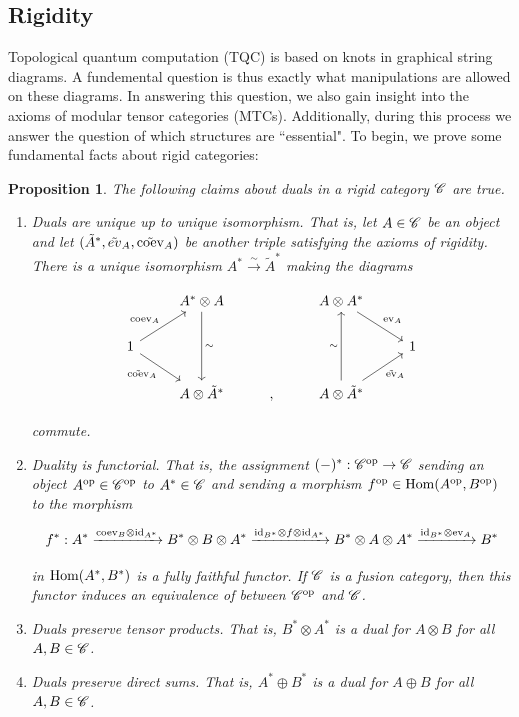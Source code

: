 \documentclass{article}
\newtheorem{proposition}{Proposition}[section]
\theoremstyle{definition}
\numberwithin{figure}{section}
\begin{document}
\subsection{Rigidity}
\label{Rigidity}

Topological quantum computation (TQC) is based on knots in graphical string diagrams. A fundemental question is thus exactly what manipulations are allowed on these diagrams. In answering this question, we also gain insight into the axioms of modular tensor categories (MTCs). Additionally, during this process we answer the question of which structures are ``essential". To begin, we prove some fundamental facts about rigid categories:

\begin{proposition}\label{rigidity} The following claims about duals in a rigid category $\mathscr{C}$ are true.

\begin{enumerate}
\item Duals are unique up to unique isomorphism. That is, let $A\in \mathscr{C}$ be an object and let $(\tilde{A}^{*},\tilde{ev}_A,\tilde{\mathrm{coev}}_A)$ be another triple satisfying the axioms of rigidity. There is a unique isomorphism $A^{*}\xrightarrow{\sim}\tilde{A}^{*}$ making the diagrams

\[\begin{tikzcd}
	& {A^{*}\otimes A} && {A\otimes A^{*}} \\
	1 &&&& 1 \\
	& {A\otimes \tilde{A}^*} & {,} & {A\otimes \tilde{A}^{*}}
	\arrow["{\coev_A}", from=2-1, to=1-2]
	\arrow["{\tilde{\coev}_A}"', from=2-1, to=3-2]
	\arrow["\sim", from=1-2, to=3-2]
	\arrow["\sim", from=3-4, to=1-4]
	\arrow["{\ev_A}", from=1-4, to=2-5]
	\arrow["{\tilde{\ev}_A}"', from=3-4, to=2-5]
\end{tikzcd}\]

commute.

\item Duality is functorial. That is, the assignment $(\--)^{*}:\mathscr{C}^{\mathrm{op}}\to \mathscr{C}$ sending an object $A^{\mathrm{op}}\in \mathscr{C}^{\mathrm{op}}$ to $A^{*}\in \mathscr{C}$ and sending a morphism $f^{\mathrm{op}}\in \mathrm{Hom}(A^{\mathrm{op}},B^{\mathrm{op}})$ to the morphism

$$f^*:A^*\xrightarrow{\mathrm{coev}_B\otimes \mathrm{id}_{A^*}} B^*\otimes B\otimes A^*\xrightarrow{\mathrm{id}_{B^*}\otimes f\otimes \mathrm{id}_{A^*}} B^*\otimes A\otimes A^* \xrightarrow{\mathrm{id}_{B^*}\otimes \mathrm{ev}_A} B^*$$

in $\mathrm{Hom}(A^{*},B^{*})$ is a fully faithful functor. If $\mathscr{C}$ is a fusion category, then this functor induces an equivalence of between $\mathscr{C}^{\mathrm{op}}$ and $\mathscr{C}$.

\item Duals preserve tensor products. That is, $B^{*}\otimes A^*$ is a dual for $A\otimes B$ for all $A,B\in \mathscr{C}$.

\item Duals preserve direct sums. That is, $A^*\oplus B^*$ is a dual for $A\oplus B$ for all $A,B\in \mathscr{C}$.
\end{enumerate}
\end{proposition}
\end{document}
